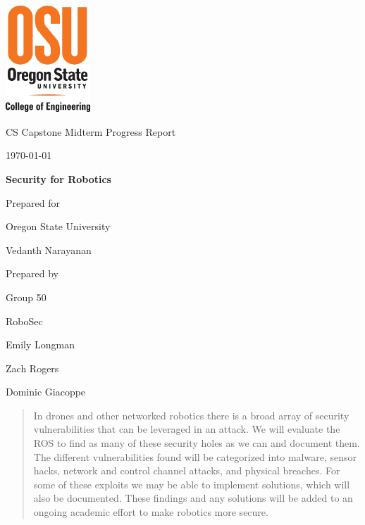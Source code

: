 \documentclass[IEEEtran,letterpaper,10pt,notitlepage,draftclsnofoot,onecolumn]{article}
\def \CapstoneTeamName{   RoboSec}
\def \CapstoneTeamNumber{   50}
\def \GroupMemberOne{     Emily Longman}
\def \GroupMemberTwo{     Zach Rogers}
\def \GroupMemberThree{     Dominic Giacoppe}
\def \CapstoneProjectName{    Security for Robotics}
\def \CapstoneSponsorCompany{ Oregon State University}
\def \CapstoneSponsorPerson{    Vedanth Narayanan}
\def \DocType{    %
        Midterm Progress Report
        }
\newcommand{\NameSigPair}[1]{\par
\makebox[2.75in][r]{#1} \hfil   \makebox[3.25in]{\makebox[2.25in]{\hrulefill} \hfill    \makebox[.75in]{\hrulefill}}
\par\vspace{-12pt} \textit{\tiny\noindent
\makebox[2.75in]{} \hfil    \makebox[3.25in]{\makebox[2.25in][r]{Signature} \hfill  \makebox[.75in][r]{Date}}}}
\renewcommand{\NameSigPair}[1]{#1}
\begin{document}
\begin{titlepage}
    \begin{singlespace}
      \includegraphics[height=4cm]{coe_v_spot1}
        \hfill
        \par\vspace{.2in}
        \centering
        \scshape{
            \huge CS Capstone \DocType \par
            {\large\today}\par
            \vspace{.5in}
            \textbf{\Huge\CapstoneProjectName}\par
            \vfill
            {\large Prepared for}\par
            \Huge \CapstoneSponsorCompany\par
            \vspace{10pt}
            {\Large\NameSigPair{\CapstoneSponsorPerson}\par}
            {\large Prepared by }\par
            Group\CapstoneTeamNumber\par
            \CapstoneTeamName\par
            \vspace{10pt}
            {\Large
                \NameSigPair{\GroupMemberOne}\par
                \NameSigPair{\GroupMemberTwo}\par
                \NameSigPair{\GroupMemberThree}\par
            }
            \vspace{20pt}
        }
        \begin{abstract}
          In drones and other networked robotics there is a broad array of security vulnerabilities that can be leveraged in an attack.
          We will evaluate the ROS to find as many of these security holes as we can and document them.
          The different vulnerabilities found will be categorized into malware, sensor hacks, network and control channel attacks, and physical breaches.
          For some of these exploits we may be able to implement solutions, which will also be documented.
          These findings and any solutions will be added to an ongoing academic effort to make robotics more secure.
        \end{abstract}
    \end{singlespace}
\end{titlepage}
\end{document}
